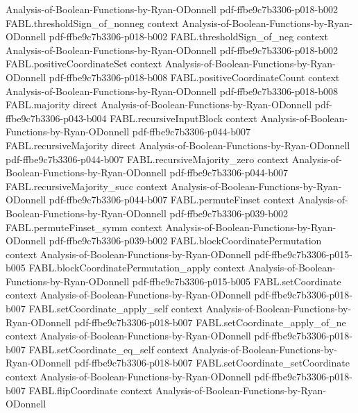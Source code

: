 \begin{theorem}
  {Analysis-of-Boolean-Functions-by-Ryan-ODonnell}
  {pdf-ffbe9c7b3306-p018-b002}
\proofstep
  {FABL.thresholdSign_of_nonneg}
  {context}
  {Analysis-of-Boolean-Functions-by-Ryan-ODonnell}
  {pdf-ffbe9c7b3306-p018-b002}
\proofstep
  {FABL.thresholdSign_of_neg}
  {context}
  {Analysis-of-Boolean-Functions-by-Ryan-ODonnell}
  {pdf-ffbe9c7b3306-p018-b002}
\proofstep
  {FABL.positiveCoordinateSet}
  {context}
  {Analysis-of-Boolean-Functions-by-Ryan-ODonnell}
  {pdf-ffbe9c7b3306-p018-b008}
\proofstep
  {FABL.positiveCoordinateCount}
  {context}
  {Analysis-of-Boolean-Functions-by-Ryan-ODonnell}
  {pdf-ffbe9c7b3306-p018-b008}
\proofstep
  {FABL.majority}
  {direct}
  {Analysis-of-Boolean-Functions-by-Ryan-ODonnell}
  {pdf-ffbe9c7b3306-p043-b004}
\proofstep
  {FABL.recursiveInputBlock}
  {context}
  {Analysis-of-Boolean-Functions-by-Ryan-ODonnell}
  {pdf-ffbe9c7b3306-p044-b007}
\proofstep
  {FABL.recursiveMajority}
  {direct}
  {Analysis-of-Boolean-Functions-by-Ryan-ODonnell}
  {pdf-ffbe9c7b3306-p044-b007}
\proofstep
  {FABL.recursiveMajority_zero}
  {context}
  {Analysis-of-Boolean-Functions-by-Ryan-ODonnell}
  {pdf-ffbe9c7b3306-p044-b007}
\proofstep
  {FABL.recursiveMajority_succ}
  {context}
  {Analysis-of-Boolean-Functions-by-Ryan-ODonnell}
  {pdf-ffbe9c7b3306-p044-b007}
\proofstep
  {FABL.permuteFinset}
  {context}
  {Analysis-of-Boolean-Functions-by-Ryan-ODonnell}
  {pdf-ffbe9c7b3306-p039-b002}
\proofstep
  {FABL.permuteFinset_symm}
  {context}
  {Analysis-of-Boolean-Functions-by-Ryan-ODonnell}
  {pdf-ffbe9c7b3306-p039-b002}
\proofstep
  {FABL.blockCoordinatePermutation}
  {context}
  {Analysis-of-Boolean-Functions-by-Ryan-ODonnell}
  {pdf-ffbe9c7b3306-p015-b005}
\proofstep
  {FABL.blockCoordinatePermutation_apply}
  {context}
  {Analysis-of-Boolean-Functions-by-Ryan-ODonnell}
  {pdf-ffbe9c7b3306-p015-b005}
\proofstep
  {FABL.setCoordinate}
  {context}
  {Analysis-of-Boolean-Functions-by-Ryan-ODonnell}
  {pdf-ffbe9c7b3306-p018-b007}
\proofstep
  {FABL.setCoordinate_apply_self}
  {context}
  {Analysis-of-Boolean-Functions-by-Ryan-ODonnell}
  {pdf-ffbe9c7b3306-p018-b007}
\proofstep
  {FABL.setCoordinate_apply_of_ne}
  {context}
  {Analysis-of-Boolean-Functions-by-Ryan-ODonnell}
  {pdf-ffbe9c7b3306-p018-b007}
\proofstep
  {FABL.setCoordinate_eq_self}
  {context}
  {Analysis-of-Boolean-Functions-by-Ryan-ODonnell}
  {pdf-ffbe9c7b3306-p018-b007}
\proofstep
  {FABL.setCoordinate_setCoordinate}
  {context}
  {Analysis-of-Boolean-Functions-by-Ryan-ODonnell}
  {pdf-ffbe9c7b3306-p018-b007}
\proofstep
  {FABL.flipCoordinate}
  {context}
  {Analysis-of-Boolean-Functions-by-Ryan-ODonnell}

\end{theorem}

